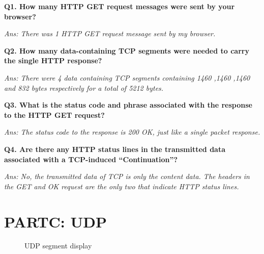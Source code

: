 \documentclass[11pt]{article}
\numberwithin{equation}{section}
\begin{document}


\textbf{Q1. How many HTTP GET request messages were sent by your browser?} 

\textsl{Ans: There was 1 HTTP GET request message sent by my browser.} \newline

\textbf{Q2. How many data-containing TCP segments were needed to carry the single HTTP response?} 

\textsl{Ans: There were 4 data containing TCP segments containing 1460 ,1460 ,1460 and 832 bytes respectively for a total of 5212 bytes.} \newline

\textbf{Q3. What is the status code and phrase associated with the response to the HTTP GET request?}

\textsl{Ans: The status code to the response is 200 OK, just like a single packet response.} \newline

\textbf{Q4. Are there any HTTP status lines in the transmitted data associated with a TCP-induced “Continuation”?}

\textsl{Ans: No, the transmitted data of TCP is only the content data.  The headers in the GET and OK request are the only two that indicate HTTP status lines.}

\section*{PARTC: UDP }

\begin{figure}[H]
\begin{center}
		\centering
		\caption{UDP segment display}
		\label{fig:q1_f1_a}
\end{center}
\end{figure} 
\end{document}
